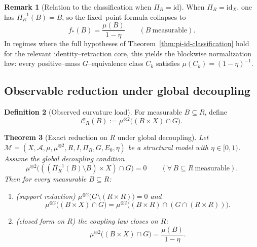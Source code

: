 \documentclass[11pt]{article}
\numberwithin{equation}{section}
\newtheorem{theorem}{Theorem}[section]
\theoremstyle{definition}
\newtheorem{definition}[theorem]{Definition}
\newtheorem{remark}[theorem]{Remark}
\begin{document}
\begin{remark}[Relation to the classification when $\Pi_R=\mathrm{id}$]\label{rem:relation-classification}
When $\Pi_R=\mathrm{id}_X$, one has $\Pi_R^{-1}(B)=B$, so the fixed--point formula collapses to
\[
f_*(B)=\frac{\mu(B)}{1-\eta}\qquad(B\ \text{measurable}).
\]
In regimes where the full hypotheses of Theorem~\ref{thm:pi-id-classification} hold for the relevant identity--retraction core, this yields the blockwise normalization law: every positive--mass $G$--equivalence class $C_k$ satisfies $\mu(C_k)=(1-\eta)^{-1}$.
\end{remark}


\subsection{Observable reduction under global decoupling}

\begin{definition}[Observed curvature load]\label{def:observed-curvature-load}
For measurable $B\subseteq R$, define
\[
\mathcal C_R(B):=\mu^{\otimes2}\big((B\times X)\cap G\big).
\]
\end{definition}

\begin{theorem}[Exact reduction on $R$ under global decoupling]\label{thm:observable-reduction}
Let $\mathcal M=(X,\allowbreak \mathcal A,\allowbreak \mu,\allowbreak \mu^{\otimes2},\allowbreak R,\allowbreak I,\allowbreak \Pi_R,\allowbreak G,\allowbreak E_0,\allowbreak \eta)$ be a structural model with $\eta\in[0,1)$.
Assume the global decoupling condition
\[
\mu^{\otimes2}\big(((\Pi_R^{-1}(B)\setminus B)\times X)\cap G\big)=0
\qquad(\forall\,B\subseteq R\ \text{measurable}).
\]
Then for every measurable $B\subseteq R$:
\begin{enumerate}[label=(\alph*),nosep]
\item (\emph{support reduction}) $\mu^{\otimes2}\big(G\setminus(R\times R)\big)=0$ and
\[
\mu^{\otimes2}\big((B\times X)\cap G\big)=\mu^{\otimes2}\big((B\times R)\cap(G\cap(R\times R))\big).
\]
\item (\emph{closed form on $R$}) the coupling law closes on $R$:
\[
\mu^{\otimes2}\big((B\times X)\cap G\big)=\frac{\mu(B)}{1-\eta}.
\]
\end{enumerate}
\end{theorem}
\end{document}
